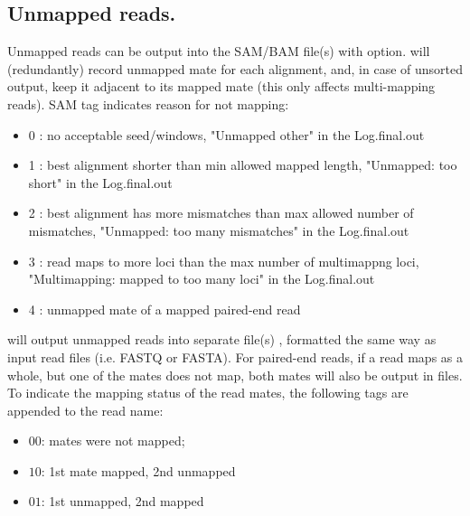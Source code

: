 \documentclass[12pt]{article}
\begin{document}
\subsection{Unmapped reads.}
Unmapped reads can be output into the SAM/BAM  file(s) with
  option.   will (redundantly) record unmapped mate for each alignment, and, in case of unsorted output, keep it adjacent to its mapped mate (this only affects multi-mapping reads).
 SAM tag indicates reason for not mapping:
\begin{itemize}[noitemsep]
	\item[] 0 : no acceptable seed/windows, "Unmapped other" in the Log.final.out
	\item[] 1 : best alignment shorter than min allowed mapped length, "Unmapped: too short" in the Log.final.out
	\item[] 2 : best alignment has more mismatches than max allowed number of mismatches, "Unmapped: too many mismatches" in the Log.final.out
	\item[] 3 : read maps to more loci than the max number of multimappng loci, "Multimapping: mapped to too many loci" in the Log.final.out
	\item[] 4 : unmapped mate of a mapped paired-end read
\end{itemize}

  will output unmapped reads into separate file(s) , formatted the same way as input read files (i.e. FASTQ or FASTA).
For paired-end reads, if a read maps as a whole, but one of the mates does not map, both mates will also be output in  files.
To indicate the mapping status of the read mates, the following tags are appended to the read name:
\begin{itemize}[noitemsep,topsep=-3pt]
	\item[] $00$: mates were not mapped;
	\item[] $10$: 1st mate mapped, 2nd unmapped
	\item[] $01$: 1st unmapped, 2nd mapped
\end{itemize}
\end{document}
